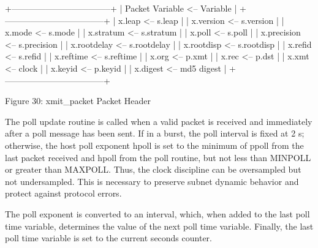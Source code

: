                 +-----------------------------------+
                | Packet Variable <--   Variable    |
                +-----------------------------------+
                | x.leap        <--     s.leap      |
                | x.version     <--     s.version   |
                | x.mode        <--     s.mode      |
                | x.stratum     <--     s.stratum   |
                | x.poll        <--     s.poll      |
                | x.precision   <--     s.precision |
                | x.rootdelay   <--     s.rootdelay |
                | x.rootdisp    <--     s.rootdisp  |
                | x.refid       <--     s.refid     |
                | x.reftime     <--     s.reftime   |
                | x.org         <--     p.xmt       |
                | x.rec         <--     p.dst       |
                | x.xmt         <--     clock       |
                | x.keyid       <--     p.keyid     |
                | x.digest      <--     md5 digest  |
                +-----------------------------------+

                Figure 30: xmit\_packet Packet Header

The poll update routine is called when a valid packet is received and
immediately after a poll message has been sent.  If in a burst, the
poll interval is fixed at 2 s; otherwise, the host poll exponent
hpoll is set to the minimum of ppoll from the last packet received
and hpoll from the poll routine, but not less than MINPOLL or greater
than MAXPOLL.  Thus, the clock discipline can be oversampled but not
undersampled.  This is necessary to preserve subnet dynamic behavior
and protect against protocol errors.

The poll exponent is converted to an interval, which, when added to
the last poll time variable, determines the value of the next poll
time variable.  Finally, the last poll time variable is set to the
current seconds counter.
